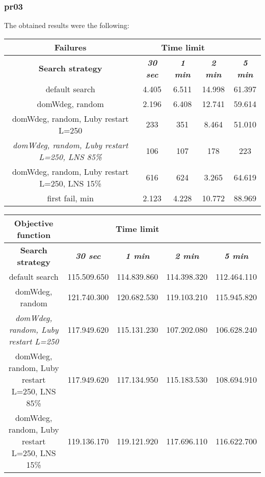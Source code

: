\subsubsection{pr03}
The obtained results were the following:
{
\renewcommand{\arraystretch}{2}
\begin{longtable}[h]{| c | c | c | c | c |}
    \hline
    \textbf{Failures} & \multicolumn{3}{c}{Time limit} & \\
    \hline
    \textbf{Search strategy} & \textbf{\textit{30 sec}} & \textbf{\textit{1 min}} & \textbf{\textit{2 min}} & \textbf{\textit{5 min}} \\
    \hline
    \endhead
    default search                                         &  4.405 &  6.511 & 14.998 &  61.397 \\
    \hline
    domWdeg, random                                        &  2.196 &  6.408 & 12.741 &  59.614 \\
    \hline
    domWdeg, random, Luby restart L=250                    &   233 &   351 &  8.464 &  51.010 \\
    \hline
    \textit{domWdeg, random, Luby restart L=250, LNS 85\%} &   106 &   107 &   178 &    223 \\
    \hline
    domWdeg, random, Luby restart L=250, LNS 15\%          &   616 &   624 &  3.265 &  64.619 \\
    \hline
    first fail, min                                        &  2.123 &  4.228 & 10.772 &  88.969 \\
    \hline
\end{longtable}
}

{
\renewcommand{\arraystretch}{2}
\begin{longtable}[h]{| c | c | c | c | c |}
    \hline
    \textbf{Objective function} & \multicolumn{3}{c}{Time limit} & \\
    \hline
    \textbf{Search strategy} & \textbf{\textit{30 sec}} & \textbf{\textit{1 min}} & \textbf{\textit{2 min}} & \textbf{\textit{5 min}} \\
    \hline
    \endhead
    default search                                & 115.509.650 & 114.839.860 & 114.398.320 & 112.464.110 \\
    \hline
    domWdeg, random                               & 121.740.300 & 120.682.530 & 119.103.210 & 115.945.820 \\
    \hline
    \textit{domWdeg, random, Luby restart L=250}  & 117.949.620 & 115.131.230 & 107.202.080 & 106.628.240 \\
    \hline
    domWdeg, random, Luby restart L=250, LNS 85\% & 117.949.620 & 117.134.950 & 115.183.530 & 108.694.910 \\
    \hline
    domWdeg, random, Luby restart L=250, LNS 15\% & 119.136.170 & 119.121.920 & 117.696.110 & 116.622.700 \\
    \hline
\end{longtable}
}
